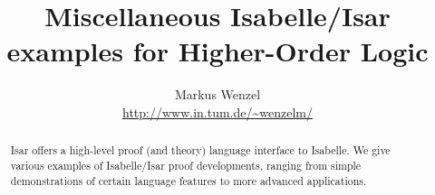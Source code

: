 





\title{Miscellaneous Isabelle/Isar examples for Higher-Order Logic}
\author{Markus Wenzel \\ \url{http://www.in.tum.de/~wenzelm/}}
\maketitle

\begin{abstract}
  Isar offers a high-level proof (and theory) language interface to Isabelle.
  We give various examples of Isabelle/Isar proof developments, ranging from
  simple demonstrations of certain language features to more advanced
  applications.
\end{abstract}

\tableofcontents


\nocite{isabelle-isar-ref,Wenzel:1999:TPHOL}




